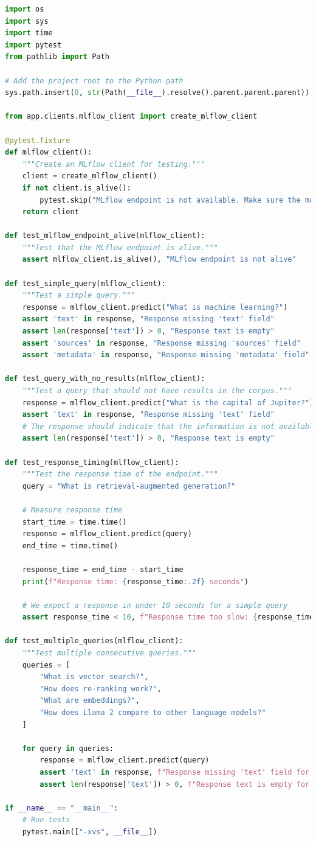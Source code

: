 \documentclass[
  screen,review,acmlarge]{acmart}
\begin{document}
\begin{lstlisting}[language=Python]
import os
import sys
import time
import pytest
from pathlib import Path

# Add the project root to the Python path
sys.path.insert(0, str(Path(__file__).resolve().parent.parent.parent))

from app.clients.mlflow_client import create_mlflow_client

@pytest.fixture
def mlflow_client():
    """Create an MLflow client for testing."""
    client = create_mlflow_client()
    if not client.is_alive():
        pytest.skip("MLflow endpoint is not available. Make sure the model is deployed.")
    return client

def test_mlflow_endpoint_alive(mlflow_client):
    """Test that the MLflow endpoint is alive."""
    assert mlflow_client.is_alive(), "MLflow endpoint is not alive"

def test_simple_query(mlflow_client):
    """Test a simple query."""
    response = mlflow_client.predict("What is machine learning?")
    assert 'text' in response, "Response missing 'text' field"
    assert len(response['text']) > 0, "Response text is empty"
    assert 'sources' in response, "Response missing 'sources' field"
    assert 'metadata' in response, "Response missing 'metadata' field"

def test_query_with_no_results(mlflow_client):
    """Test a query that should not have results in the corpus."""
    response = mlflow_client.predict("What is the capital of Jupiter?")
    assert 'text' in response, "Response missing 'text' field"
    # The response should indicate that the information is not available
    assert len(response['text']) > 0, "Response text is empty"

def test_response_timing(mlflow_client):
    """Test the response time of the endpoint."""
    query = "What is retrieval-augmented generation?"
    
    # Measure response time
    start_time = time.time()
    response = mlflow_client.predict(query)
    end_time = time.time()
    
    response_time = end_time - start_time
    print(f"Response time: {response_time:.2f} seconds")
    
    # We expect a response in under 10 seconds for a simple query
    assert response_time < 10, f"Response time too slow: {response_time:.2f} seconds"

def test_multiple_queries(mlflow_client):
    """Test multiple consecutive queries."""
    queries = [
        "What is vector search?",
        "How does re-ranking work?",
        "What are embeddings?",
        "How does Llama 2 compare to other language models?"
    ]
    
    for query in queries:
        response = mlflow_client.predict(query)
        assert 'text' in response, f"Response missing 'text' field for query: {query}"
        assert len(response['text']) > 0, f"Response text is empty for query: {query}"

if __name__ == "__main__":
    # Run tests
    pytest.main(["-xvs", __file__])
\end{lstlisting}
\end{document}
